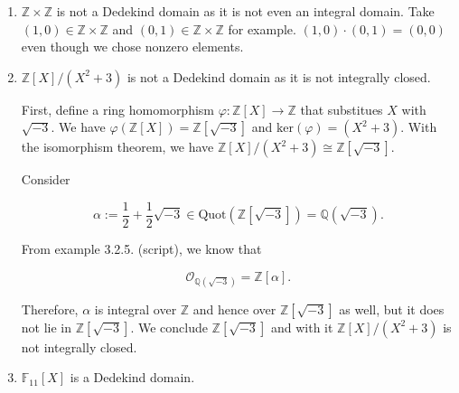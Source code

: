 \documentclass[a4paper]{article}
\theoremstyle{definition}
\begin{document}
\begin{enumerate}
    \item \(\mathbb{Z}\times\mathbb{Z}\) is not a Dedekind domain as it is not even an integral domain. Take \((1, 0) \in \mathbb{Z}\times\mathbb{Z}\) and \((0, 1) \in \mathbb{Z}\times\mathbb{Z}\) for example. \((1, 0) \cdot (0, 1) = (0, 0)\) even though we chose nonzero elements.
    \item \(\mathbb{Z}[X] / (X^2 + 3)\) is not a Dedekind domain as it is not integrally closed.

    First, define a ring homomorphism \(\varphi: \mathbb{Z}[X] \rightarrow \mathbb{Z}\) that substitues \(X\) with \(\sqrt{-3}\). We have \(\varphi(\mathbb{Z}[X]) = \mathbb{Z}[\sqrt{-3}]\) and \(\text{ker} (\varphi) = (X^2 + 3)\). With the isomorphism theorem, we have \(\mathbb{Z}[X] / (X^2 + 3) \cong \mathbb{Z}[\sqrt{-3}]\).

    Consider

    \begin{equation}
        \alpha := \frac{1}{2} + \frac{1}{2} \sqrt{-3} \in \text{Quot}(\mathbb{Z}[\sqrt{-3}]) = \mathbb{Q}(\sqrt{-3}) \text{.}
    \end{equation}

    From example 3.2.5. (script), we know that

    \begin{equation}
        \mathcal{O}_{\mathbb{Q}(\sqrt{-3})} = \mathbb{Z}[\alpha] \text{.}
    \end{equation}
    
    Therefore, \(\alpha\) is integral over \(\mathbb{Z}\) and hence over \(\mathbb{Z}[\sqrt{-3}]\) as well, but it does not lie in \(\mathbb{Z}[\sqrt{-3}]\). We conclude \(\mathbb{Z}[\sqrt{-3}]\) and with it \(\mathbb{Z}[X] / (X^2 + 3)\) is not integrally closed.
    \item \(\mathbb{F}_{11}[X]\) is a Dedekind domain.
    

\end{enumerate}
\end{document}
